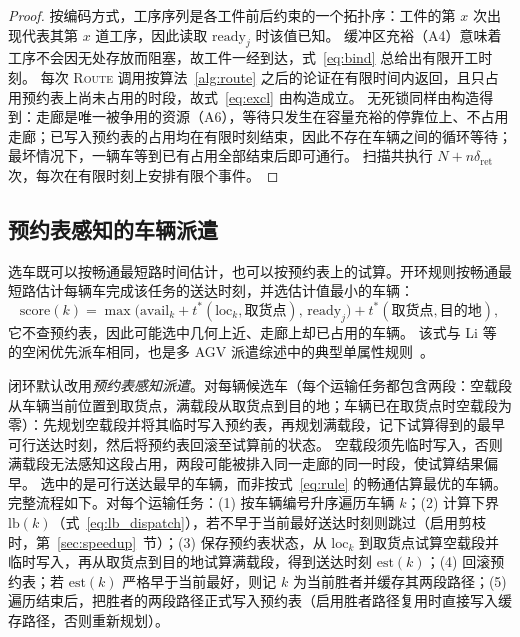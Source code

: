 \documentclass[manuscript,screen,review]{acmart}
\begin{document}
\begin{proof}
  按编码方式，工序序列是各工件前后约束的一个拓扑序：工件的第 $x$ 次出现代表其第 $x$ 道工序，因此读取 $\mathrm{ready}_j$ 时该值已知。
  缓冲区充裕（A4）意味着工序不会因无处存放而阻塞，故工件一经到达，式~\eqref{eq:bind} 总给出有限开工时刻。
  每次 \textsc{Route} 调用按算法~\ref{alg:route} 之后的论证在有限时间内返回，且只占用预约表上尚未占用的时段，故式~\eqref{eq:excl} 由构造成立。
  无死锁同样由构造得到：走廊是唯一被争用的资源（A6），等待只发生在容量充裕的停靠位上、不占用走廊；已写入预约表的占用均在有限时刻结束，因此不存在车辆之间的循环等待；最坏情况下，一辆车等到已有占用全部结束后即可通行。
  扫描共执行 $N+n\delta_{\mathrm{ret}}$ 次，每次在有限时刻上安排有限个事件。
\end{proof}

\subsection{预约表感知的车辆派遣}
\label{sec:dispatch}

选车既可以按畅通最短路时间估计，也可以按预约表上的试算。开环规则按畅通最短路估计每辆车完成该任务的送达时刻，并选估计值最小的车辆：
\begin{equation}
\label{eq:rule}
\mathrm{score}(k)=\max\bigl(\mathrm{avail}_k+t^{*}(\mathrm{loc}_k,\text{取货点}),\,
\mathrm{ready}_j\bigr)+t^{*}(\text{取货点},\text{目的地}),
\end{equation}
它不查预约表，因此可能选中几何上近、走廊上却已占用的车辆。
该式与 Li 等~\cite{li2026framework} 的空闲优先派车相同，也是多 AGV 派遣综述中的典型单属性规则~\cite{lu2022agv}。

闭环默认改用\emph{预约表感知派遣}。对每辆候选车（每个运输任务都包含两段：空载段从车辆当前位置到取货点，满载段从取货点到目的地；车辆已在取货点时空载段为零）：先规划空载段并将其临时写入预约表，再规划满载段，记下试算得到的最早可行送达时刻，然后将预约表回滚至试算前的状态。
空载段须先临时写入，否则满载段无法感知这段占用，两段可能被排入同一走廊的同一时段，使试算结果偏早。
选中的是可行送达最早的车辆，而非按式~\eqref{eq:rule} 的畅通估算最优的车辆。
完整流程如下。对每个运输任务：(1) 按车辆编号升序遍历车辆 $k$；(2) 计算下界 $\mathrm{lb}(k)$（式~\eqref{eq:lb_dispatch}），若不早于当前最好送达时刻则跳过（启用剪枝时，第~\ref{sec:speedup}~节）；(3) 保存预约表状态，从 $\mathrm{loc}_k$ 到取货点试算空载段并临时写入，再从取货点到目的地试算满载段，得到送达时刻 $\mathrm{est}(k)$；(4) 回滚预约表；若 $\mathrm{est}(k)$ 严格早于当前最好，则记 $k$ 为当前胜者并缓存其两段路径；(5) 遍历结束后，把胜者的两段路径正式写入预约表（启用胜者路径复用时直接写入缓存路径，否则重新规划）。
\end{document}
